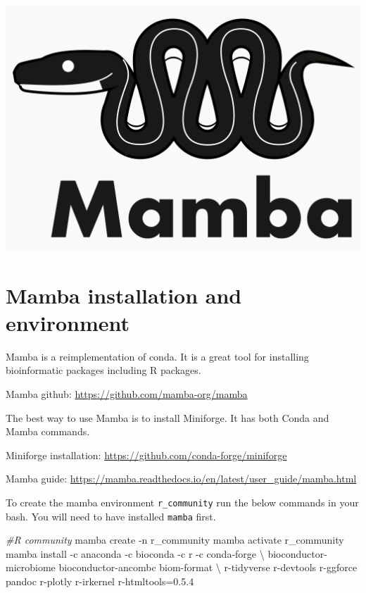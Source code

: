 \documentclass[
]{book}
\newenvironment{Shaded}{\begin{snugshade}}{\end{snugshade}}
\newcommand{\AttributeTok}[1]{\textcolor[rgb]{0.13,0.29,0.53}{#1}}
\newcommand{\CommentTok}[1]{\textcolor[rgb]{0.56,0.35,0.01}{\textit{#1}}}
\newcommand{\DataTypeTok}[1]{\textcolor[rgb]{0.13,0.29,0.53}{#1}}
\newcommand{\ExtensionTok}[1]{#1}
\newcommand{\NormalTok}[1]{#1}
\begin{document}
\includegraphics{figures/mamba_logo.png}

\hypertarget{mamba_install}{%
\section{Mamba installation and environment}\label{mamba_install}}

Mamba is a reimplementation of conda. It is a great tool for installing bioinformatic packages including R packages.

Mamba github: \url{https://github.com/mamba-org/mamba}

The best way to use Mamba is to install Miniforge. It has both Conda and Mamba commands.

Miniforge installation: \url{https://github.com/conda-forge/miniforge}

Mamba guide: \url{https://mamba.readthedocs.io/en/latest/user_guide/mamba.html}

To create the mamba environment \texttt{r\_community} run the below commands in your bash. You will need to have installed \texttt{mamba} first.

\begin{Shaded}
\begin{Highlighting}[]
\CommentTok{\#R community}
\ExtensionTok{mamba}\NormalTok{ create }\AttributeTok{{-}n}\NormalTok{ r\_community}
\ExtensionTok{mamba}\NormalTok{ activate r\_community}
\ExtensionTok{mamba}\NormalTok{ install }\AttributeTok{{-}c}\NormalTok{ anaconda }\AttributeTok{{-}c}\NormalTok{ bioconda }\AttributeTok{{-}c}\NormalTok{ r }\AttributeTok{{-}c}\NormalTok{ conda{-}forge }\DataTypeTok{\textbackslash{}}
\NormalTok{bioconductor{-}microbiome bioconductor{-}ancombc biom{-}format }\DataTypeTok{\textbackslash{}}
\NormalTok{r{-}tidyverse r{-}devtools r{-}ggforce pandoc r{-}plotly r{-}irkernel r{-}htmltools=0.5.4}
\end{Highlighting}
\end{Shaded}
\end{document}
